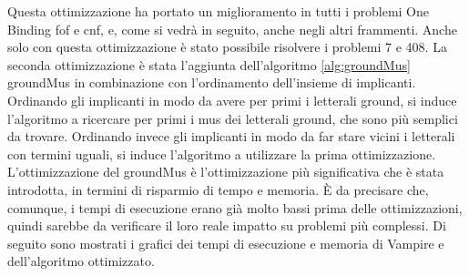\documentclass[./main.tex]{subfiles}
\begin{document}
Questa ottimizzazione ha portato un miglioramento in tutti i problemi One Binding fof e cnf, e, come si vedrà in seguito, 
anche negli altri frammenti. 
Anche solo con questa ottimizzazione è stato possibile risolvere i problemi 7 e 408.
La seconda ottimizzazione è stata l'aggiunta dell'algoritmo \ref{alg:groundMus} groundMus 
in combinazione con l'ordinamento dell'insieme di implicanti.
Ordinando gli implicanti in modo da avere per primi i letterali ground, si induce l'algoritmo a ricercare per 
primi i mus dei letterali ground, che sono più semplici da trovare.
Ordinando invece gli implicanti in modo da far stare vicini i letterali con termini uguali, si induce 
l'algoritmo a utilizzare la prima ottimizzazione.
L'ottimizzazione del groundMus è l'ottimizzazione più significativa che è stata introdotta, in termini di risparmio di tempo e memoria.
È da precisare che, comunque, i tempi di esecuzione erano già molto bassi prima delle ottimizzazioni,
quindi sarebbe da verificare il loro reale impatto su problemi più complessi.
Di seguito sono mostrati i grafici dei tempi di esecuzione e memoria di Vampire e dell'algoritmo ottimizzato.



\end{document}
